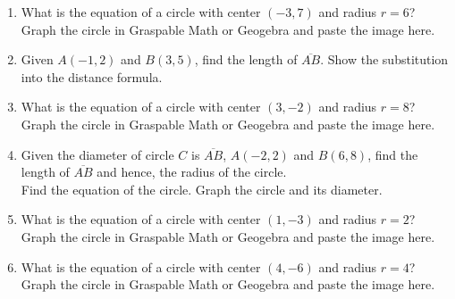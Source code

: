 \begin{enumerate}
\item What is the equation of a circle with center $(-3,7)$ and radius $r=6$?\\[0.5cm]
  Graph the circle in Graspable Math or Geogebra and paste the image here.

\item Given $A(-1,2)$ and $B(3,5)$, find the length of $\overline{AB}$. Show the substitution into the distance formula.

\item What is the equation of a circle with center $(3,-2)$ and radius $r=8$?\\[0.5cm]
Graph the circle in Graspable Math or Geogebra and paste the image here.

\item Given the diameter of circle $C$ is $\overline{AB}$, $A(-2,2)$ and $B(6,8)$, find the length of $\overline{AB}$ and hence, the radius of the circle.\\[0.25cm]
Find the equation of the circle. Graph the circle and its diameter.

\item What is the equation of a circle with center $(1,-3)$ and radius $r=2$?\\[0.5cm]
  Graph the circle in Graspable Math or Geogebra and paste the image here.

\item What is the equation of a circle with center $(4,-6)$ and radius $r=4$?\\[0.5cm]
  Graph the circle in Graspable Math or Geogebra and paste the image here.


\end{enumerate}
